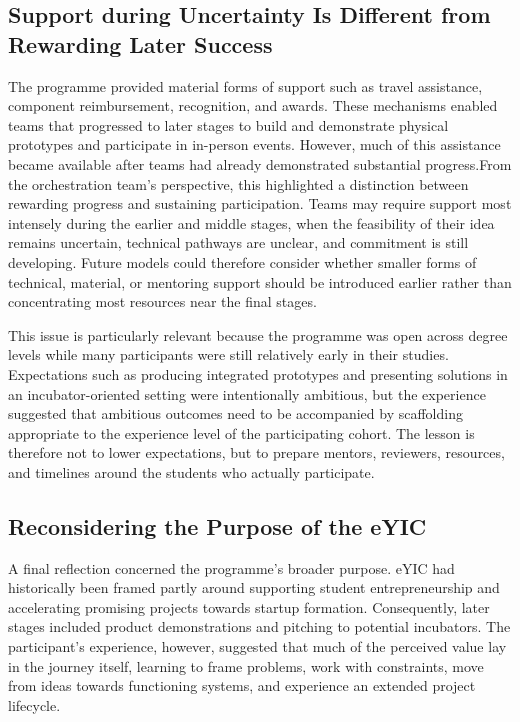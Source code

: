 \documentclass[runningheads]{llncs}
\begin{document}
\subsection{Support during Uncertainty Is Different from Rewarding Later Success}

The programme provided material forms of support such as travel assistance, component reimbursement, recognition, and awards. These mechanisms enabled teams that progressed to later stages to build and demonstrate physical prototypes and participate in in-person events. However, much of this assistance became available after teams had already demonstrated substantial progress.From the orchestration team's perspective, this highlighted a distinction between rewarding progress and sustaining participation. Teams may require support most intensely during the earlier and middle stages, when the feasibility of their idea remains uncertain, technical pathways are unclear, and commitment is still developing. Future models could therefore consider whether smaller forms of technical, material, or mentoring support should be introduced earlier rather than concentrating most resources near the final stages.

This issue is particularly relevant because the programme was open across degree levels while many participants were still relatively early in their studies. Expectations such as producing integrated prototypes and presenting solutions in an incubator-oriented setting were intentionally ambitious, but the experience suggested that ambitious outcomes need to be accompanied by scaffolding appropriate to the experience level of the participating cohort. The lesson is therefore not to lower expectations, but to prepare mentors, reviewers, resources, and timelines around the students who actually participate.

\subsection{Reconsidering the Purpose of the eYIC}

A final reflection concerned the programme's broader purpose. eYIC had historically been framed partly around supporting student entrepreneurship and accelerating promising projects towards startup formation. Consequently, later stages included product demonstrations and pitching to potential incubators. The participant's experience, however, suggested that much of the perceived value lay in the journey itself, learning to frame problems, work with constraints, move from ideas towards functioning systems, and experience an extended project lifecycle.
\end{document}
